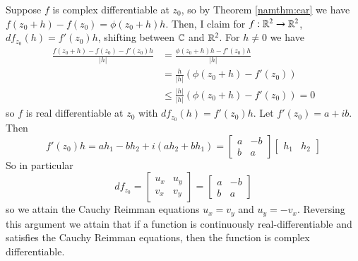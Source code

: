 \documentclass[12pt, a4paper, oneside, openright, titlepage]{book}
\begin{document}
Suppose $f$ is complex differentiable at $z_0$, so by Theorem \ref{namthm:car} we have $f(z_0+h) - f(z_0) = \phi(z_0+h)h$. Then, I claim for $f:\mathbb R^2\rightarrow \mathbb R^2$, $df_{z_0}(h) = f'(z_0)h$, shifting between $\mathbb C$ and $\mathbb R^2$. For $h \neq 0$ we have \begin{align*}
    \frac{f(z_0+h)-f(z_0) -f'(z_0)h}{|h|} &= \frac{\phi(z_0+h)h-f'(z_0)h}{|h|} \\
    &= \frac{h}{|h|}(\phi(z_0+h)-f'(z_0)) \\
    &\leq \frac{|h|}{|h|}(\phi(z_0+h)-f'(z_0)) = 0
\end{align*}
so $f$ is real differentiable at $z_0$ with $df_{z_0}(h) = f'(z_0)h$. Let $f'(z_0) = a+ib$. Then $$f'(z_0)h = ah_1-bh_2 + i(ah_2+bh_1) = \begin{bmatrix} a & -b \\ b & a \end{bmatrix}\begin{bmatrix} h_1 & h_2 \end{bmatrix}$$ So in particular $$df_{z_0} = \begin{bmatrix} u_x & u_y \\ v_x & v_y \end{bmatrix} = \begin{bmatrix} a & -b \\ b & a \end{bmatrix}$$ so we attain the Cauchy Reimman equations $u_x = v_y$ and $u_y = -v_x$. Reversing this argument we attain that if a function is continuously real-differentiable and satisfies the Cauchy Reimman equations, then the function is complex differentiable.
\end{document}
